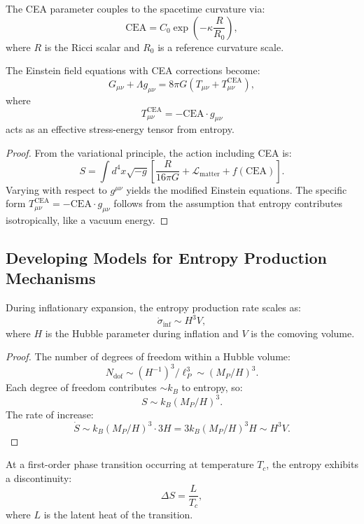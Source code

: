 \begin{definition}
The CEA parameter couples to the spacetime curvature via:
\[
\text{CEA} = C_0 \exp\left(-\kappa \frac{R}{R_0}\right),
\]
where $R$ is the Ricci scalar and $R_0$ is a reference curvature scale.
\end{definition}

\begin{theorem}
The Einstein field equations with CEA corrections become:
\[
G_{\mu\nu} + \Lambda g_{\mu\nu} = 8\pi G\left(T_{\mu\nu} + T^{\text{CEA}}_{\mu\nu}\right),
\]
where
\[
T^{\text{CEA}}_{\mu\nu} = -\text{CEA} \cdot g_{\mu\nu}
\]
acts as an effective stress-energy tensor from entropy.
\end{theorem}

\begin{proof}
From the variational principle, the action including CEA is:
\[
S = \int d^4x \sqrt{-g}\left[\frac{R}{16\pi G} + \mathcal{L}_{\text{matter}} + f(\text{CEA})\right].
\]
Varying with respect to $g^{\mu\nu}$ yields the modified Einstein equations. The specific form $T^{\text{CEA}}_{\mu\nu} = -\text{CEA} \cdot g_{\mu\nu}$ follows from the assumption that entropy contributes isotropically, like a vacuum energy.
\end{proof}

\subsection{Developing Models for Entropy Production Mechanisms}

\begin{theorem}
During inflationary expansion, the entropy production rate scales as:
\[
\dot{\sigma}_{\text{inf}} \sim H^3 V,
\]
where $H$ is the Hubble parameter during inflation and $V$ is the comoving volume.
\end{theorem}

\begin{proof}
The number of degrees of freedom within a Hubble volume:
\[
N_{\text{dof}} \sim (H^{-1})^3 / \ell_P^3 \sim (M_P/H)^3.
\]
Each degree of freedom contributes $\sim k_B$ to entropy, so:
\[
S \sim k_B (M_P/H)^3.
\]
The rate of increase:
\[
\dot{S} \sim k_B (M_P/H)^3 \cdot 3H = 3k_B (M_P/H)^3 H \sim H^3 V.
\]
\end{proof}

\begin{lemma}
At a first-order phase transition occurring at temperature $T_c$, the entropy exhibits a discontinuity:
\[
\Delta S = \frac{L}{T_c},
\]
where $L$ is the latent heat of the transition.
\end{lemma}

